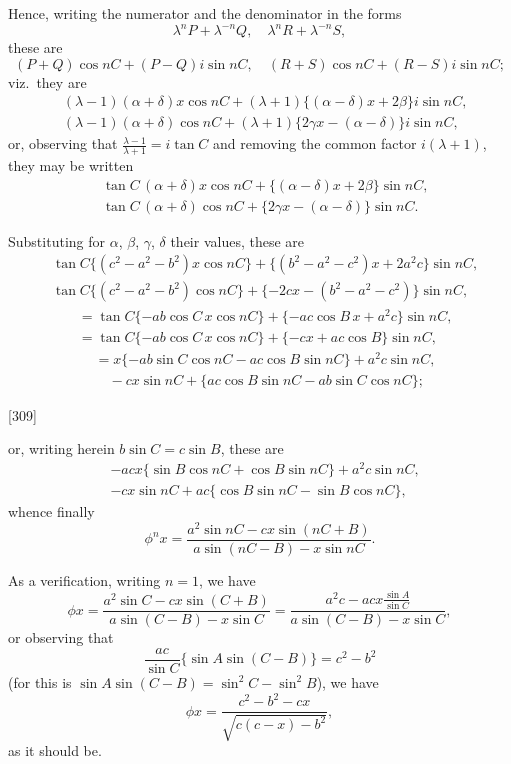 \documentclass[12pt,a4paper]{article}
\theoremstyle{definition}
\begin{document}
Hence, writing the numerator and the denominator in the forms
\[
\lambda^n P + \lambda^{-n}Q,\quad \lambda^n R + \lambda^{-n}S,
\]
these are
\[
(P + Q)\cos nC + (P - Q)i\sin nC,\quad (R + S)\cos nC + (R - S)i\sin nC;
\]
viz.\ they are
\begin{align*}
&(\lambda - 1)(\alpha + \delta)x\cos nC + (\lambda + 1)\{(\alpha - \delta)x + 2\beta\}i\sin nC,\\
&(\lambda - 1)(\alpha + \delta)\cos nC + (\lambda + 1)\{2\gamma x - (\alpha - \delta)\}i\sin nC,
\end{align*}
or, observing that $\frac{\lambda - 1}{\lambda + 1} = i\tan C$ and removing the common factor $i(\lambda + 1)$, they may be written
\begin{align*}
&\tan C\,(\alpha + \delta)x\cos nC + \{ (\alpha - \delta)x + 2\beta \}\sin nC,\\
&\tan C\,(\alpha + \delta)\cos nC + \{ 2\gamma x - (\alpha - \delta) \}\sin nC.
\end{align*}

Substituting for $\alpha$, $\beta$, $\gamma$, $\delta$ their values, these are
\begin{align*}
&\tan C\{(c^2 - a^2 - b^2)x\cos nC\} + \{(b^2 - a^2 - c^2)x + 2a^2c\}\sin nC,\\
&\tan C\{(c^2 - a^2 - b^2)\cos nC\} + \{-2cx - (b^2 - a^2 - c^2)\}\sin nC,
\end{align*}
\begin{align*}
&= \tan C\{-ab\cos C\,x\cos nC\} + \{-ac\cos B\,x + a^2c\}\sin nC,\\
&= \tan C\{-ab\cos C\,x\cos nC\} + \{-cx + ac\cos B\}\sin nC,
\end{align*}
\begin{align*}
&= x\{-ab\sin C\cos nC - ac\cos B\sin nC\} + a^2c\sin nC,\\
&\quad -cx\sin nC + \{ac\cos B\sin nC - ab\sin C\cos nC\};
\end{align*}

[309]

or, writing herein $b\sin C = c\sin B$, these are
\begin{align*}
&-acx\{\sin B\cos nC + \cos B\sin nC\} + a^2c\sin nC,\\
&-cx\sin nC + ac\{\cos B\sin nC - \sin B\cos nC\},
\end{align*}
whence finally
\[
\phi^n x = \frac{a^2\sin nC - cx\sin(nC + B)}{a\sin(nC - B) - x\sin nC}.
\]

As a verification, writing $n = 1$, we have
\[
\phi x = \frac{a^2\sin C - cx\sin(C + B)}{a\sin(C - B) - x\sin C}
= \frac{a^2c - acx\frac{\sin A}{\sin C}}{a\sin(C - B) - x\sin C},
\]
or observing that
\[
\frac{ac}{\sin C}\{\sin A\sin(C - B)\} = c^2 - b^2
\]
(for this is $\sin A\sin(C - B) = \sin^2 C - \sin^2 B$), we have
\[
\phi x = \frac{c^2 - b^2 - cx}{\sqrt{c(c - x) - b^2}},
\]
as it should be.
\end{document}
